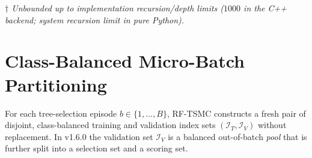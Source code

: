 \documentclass[11pt,a4paper]{article}
\newcommand{\code}[1]{\texttt{#1}}
\begin{document}
\begin{table}[htbp]
  \vspace{4pt}
  \begin{minipage}{\textwidth}
    \footnotesize\emph{$\dagger$ Unbounded up to implementation recursion/depth limits ($1000$ in the C++ backend; system recursion limit in pure Python).}
  \end{minipage}
\end{table}

\section{Class-Balanced Micro-Batch Partitioning}
\label{sec:batches}

For each tree-selection episode $b \in \{1, \dots, B\}$, RF-TSMC constructs a fresh pair of disjoint, class-balanced training and validation index sets $(\mathcal{I}_T, \mathcal{I}_V)$ without replacement. In v1.6.0 the validation set $\mathcal{I}_V$ is a balanced out-of-batch \emph{pool} that is further split into a selection set and a scoring set.
\end{document}
